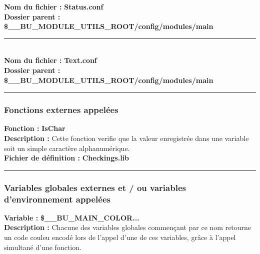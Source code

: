 \documentclass[a4paper,10pt]{article}
\begin{document}
\textbf{Nom du fichier :} \textbf{\color{lime}Status.conf\color{white}}\\[1\baselineskip]
\textbf{Dossier parent :} \textbf{\color{orange}\$\_\_BU\_MODULE\_UTILS\_ROOT\color{lime}/config/modules/main\color{white}}\\[1\baselineskip]



\color{lime}\par\noindent\rule{\textwidth}{0.4pt}\color{white}\\[1\baselineskip]

\textbf{Nom du fichier :} \textbf{\color{lime}Text.conf\color{white}}\\[1\baselineskip]
\textbf{Dossier parent :} \textbf{\color{orange}\$\_\_BU\_MODULE\_UTILS\_ROOT\color{lime}/config/modules/main\color{white}}\\[1\baselineskip]




\color{blue}\par\noindent\rule{\textwidth}{0.4pt}\color{white}

\color{blue}
\subsubsection{Fonctions externes appelées}\color{white}
\textbf{Fonction :} \textbf{\color{mauve}IsChar\color{white}}\\[1\baselineskip]

\textbf{Description :} Cette fonction verifie que la valeur enregistrée dans une variable soit un simple caractère alphanumérique.\\[1\baselineskip]

\textbf{Fichier de définition :} \textbf{\color{lime}Checkings.lib\color{white}}\\[1\baselineskip]



\color{blue}\par\noindent\rule{\textwidth}{0.4pt}\color{white}

\color{blue}
\subsubsection{Variables globales externes et / ou variables d'environnement appelées}\color{white}
\textbf{Variable :} \textbf{\color{orange}\$\_\_BU\_MAIN\_COLOR...\color{white}}\\[1\baselineskip]

\textbf{Description :} Chacune des variables globales commençant par ce nom retourne un code couleu encodé lors de l'appel d'une de ces variables, grâce à l'appel simultané d'une fonction.\\[1\baselineskip]
\end{document}
